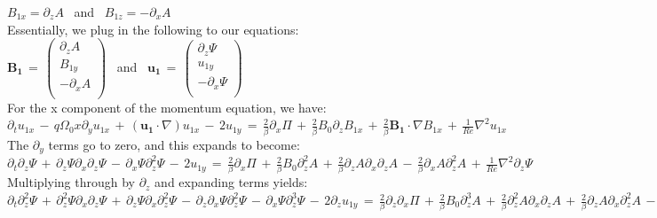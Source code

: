 \documentclass[letterpaper,12pt]{article}
\newcommand\reye{\mathrel{Re}}
\begin{document}
$B_{1x} = \partial_z A$ \, and \, $B_{1z} = - \partial_x A$ \\

Essentially, we plug in the following to our equations: \\

$\mathbf{B_1} \, = \, \left(\begin{matrix}

\partial_zA \\
B_{1y} \\
-\partial_xA \\

\end{matrix}\right)$ \, and \, $\mathbf{u_1} \, = \, \left(\begin{matrix}

\partial_z\Psi \\
u_{1y} \\
-\partial_x\Psi \\
\end{matrix}\right)$ \\

For the x component of the momentum equation, we have: \\

$\partial_t u_{1x} \, - \, q \Omega_0 x \partial_y u_{1x} \, + \, \left(\mathbf{u_1} \cdot \nabla\right) u_{1x} \, - \, 2 u_{1y} \, = \, \frac{2}{\beta} \partial_x \Pi \, + \, \frac{2}{\beta} B_0 \partial_z B_{1x} \, + \, \frac{2}{\beta} \mathbf{B_1} \cdot \nabla B_{1x} \, + \, \frac{1}{\reye}\nabla^2 u_{1x} $ \\

The $\partial_y$ terms go to zero, and this expands to become: \\

$\partial_t\partial_z\Psi \, + \, \partial_z\Psi \partial_x \partial_z \Psi \, - \, \partial_x \Psi \partial_z^2\Psi \, - \, 2 u_{1y} \, = \, \frac{2}{\beta}\partial_x \Pi \, + \, \frac{2}{\beta} B_0 \partial_z^2 A \, + \, \frac{2}{\beta} \partial_z A \partial_x \partial_z A \, - \, \frac{2}{\beta} \partial_x A \partial_z^2 A \, + \, \frac{1}{\reye} \nabla^2 \partial_z \Psi$ \\

Multiplying through by $\partial_z$ and expanding terms yields: \\

$\partial_t \partial_z^2 \Psi \, + \, \partial_z^2\Psi\partial_x\partial_z\Psi \, + \, \partial_z\Psi \partial_x\partial_z^2 \Psi \, - \, \partial_z\partial_x\Psi\partial_z^2\Psi \, - \, \partial_x \Psi \partial_z^3 \Psi \, - \, 2\partial_z u_{1y} \, = \, \frac{2}{\beta}\partial_z\partial_x\Pi \, + \, \frac{2}{\beta} B_0\partial_z^3A \, + \, \frac{2}{\beta}\partial_z^2 A \partial_x \partial_z A \, + \, \frac{2}{\beta}\partial_zA\partial_x\partial_z^2 A \, - \, \frac{2}{\beta}\partial_z\partial_x A \partial_z^2 A \, - \, \frac{2}{\beta}\partial_xA\partial_z^3A \, + \, \frac{1}{\reye} \nabla^2 \partial_z^2 \Psi $ \\
\end{document}
